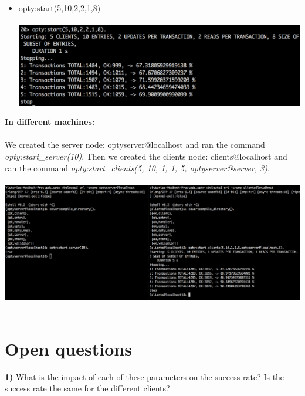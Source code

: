 \documentclass[a4paper, 11pt]{article}
\begin{document}
\begin{itemize}
\item opty:start(5,10,2,2,1,8)\\\\
\includegraphics[scale=0.5]{images/exp-v-5.png} \\
\end{itemize}

\newpage
\textbf{In different machines:}\\\\

We created the server node: optyserver@localhost and ran the command \textit{opty:start\_server(10)}. Then we created the clients node: clients@localhost and ran the command \textit{opty:start\_clients(5, 10, 1, 1, 5, optyserver@server, 3)}.\\\\
\includegraphics[scale=0.29]{images/distributed.png} \\\\

\section{Open questions}

\textbf{1)} What is the impact of each of these parameters on the success rate? Is the success rate the same for the different clients?\\
\end{document}
